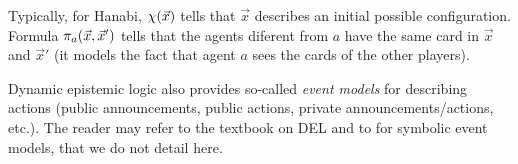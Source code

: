 Typically, for Hanabi, $\chi(\vec x)$ tells that $\vec x$ describes an initial possible configuration. Formula $\pi_{a}(\vec x, \vec x')$ tells that the agents diferent from $a$ have the same card in $\vec x$ and $\vec x'$ (it models the fact that agent $a$ sees the cards of the other players).

Dynamic epistemic logic also provides so-called \emph{event models} for describing actions (public announcements, public actions, private announcements/actions, etc.). The reader may refer to the textbook on DEL \cite{DitmarschvdHoekKooi} and to \cite{DBLP:conf/atal/CharrierS17} for symbolic event models, that we do not detail here.